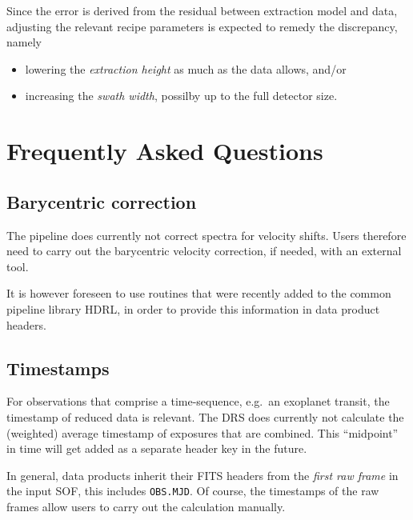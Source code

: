 Since the error is derived from the residual between extraction model and data, adjusting the relevant recipe parameters is expected to remedy the discrepancy, namely
\begin{itemize}
    \item lowering the \emph{extraction height} as much as the data allows, and/or
    \item increasing the \emph{swath width}, possilby up to the full detector size.
\end{itemize}

\section{Frequently Asked Questions}

\subsection{Barycentric correction}
The pipeline does currently not correct spectra for velocity shifts. Users therefore need to carry out the barycentric velocity correction, if needed, with an external tool.

It is however foreseen to use routines that were recently added to the
common pipeline library HDRL, in order to provide this information in 
data product headers.

\subsection{Timestamps}
For observations that comprise a time-sequence, e.g.~an exoplanet transit,
the timestamp of reduced data is relevant. The DRS does currently not 
calculate the (weighted) average timestamp of exposures that are combined. This ``midpoint'' in time will get added as a separate header key in the future.

In general, data products inherit their FITS headers from the \emph{first raw frame} in the input SOF, this includes \texttt{OBS.MJD}. Of course, the timestamps of the raw frames allow users to carry out the calculation manually.